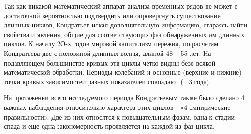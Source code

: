 \documentclass[a4paper,14pt]{extarticle}
\begin{document}
 	Так как никакой математический аппарат анализа временных рядов не может с достаточной вероятностью подтвердить или опровергнуть существование длинных циклов, Кондратьев искал дополнительную информацию, стараясь найти свойства и явления, общие для соответствующих фаз обнаруженных им длинных циклов. К началу 2О-х годов мировой капитализм пережил, по расчетам Кондратьева две с половиной длинных волны, длиной 48 – 55 лет. На подавляющем большинстве кривых эти циклы четко видны безо всякой математической обработки. Периоды колебаний и основные (верхние и нижние) точки кривых зависимостей разных показателей совпадают (±3 года).
 	
 	
 	На протяжении всего исследуемого периода Кондратьевым также было сделано 4 важных наблюдения относительно характера этих циклов - «4 эмпирические правильности». Две из них относятся к повышательным фазам, одна к стадии спада и еще одна закономерность проявляется на каждой из фаз цикла.
 	
\end{document}

